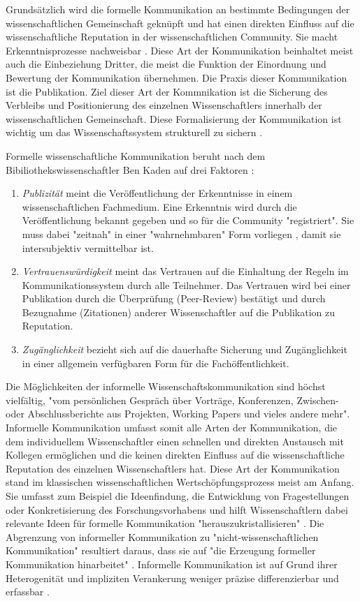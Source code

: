 Grundsätzlich wird die formelle Kommunikation an bestimmte Bedingungen der wissenschaftlichen Gemeinschaft geknüpft und hat einen direkten Einfluss auf die wissenschaftliche Reputation in der wissenschaftlichen Community. Sie macht Erkenntnisprozesse nachweisbar \cite{kaden_2009_library}. Diese Art der Kommunikation beinhaltet meist auch die Einbeziehung Dritter, die meist die Funktion der Einordnung und Bewertung der Kommunikation übernehmen. Die Praxis dieser Kommunikation ist die Publikation. Ziel dieser Art der Kommnikation ist die Sicherung des Verbleibs und Positionierung des einzelnen Wissenschaftlers innerhalb der wissenschaftlichen Gemeinschaft. Diese Formalisierung der Kommunikation ist wichtig um das Wissenschaftssystem strukturell zu sichern \cite{kaden_2009_library}.

Formelle wissenschaftliche Kommunikation beruht nach dem Bibiliothekswissenschaftler Ben Kaden auf drei Faktoren \cite{kaden_2009_library}:
\begin{enumerate}
\item \textit{Publizität} meint die Veröffentlichung der Erkenntnisse in einem wissenschaftlichen Fachmedium. Eine Erkenntnis wird durch die Veröffentlichung bekannt gegeben und so für die Community "registriert".  Sie muss dabei "zeitnah" in einer "wahrnehmbaren" Form vorliegen \cite{Schimank_2012}, damit sie intersubjektiv vermittelbar ist.
\item \textit{Vertrauenswürdigkeit} meint das Vertrauen auf die Einhaltung der Regeln im Kommunikationssystem durch alle Teilnehmer. Das Vertrauen wird bei einer Publikation durch die Überprüfung (Peer-Review) bestätigt und durch Bezugnahme (Zitationen) anderer Wissenschaftler auf die Publikation zu Reputation.
\item \textit{Zugänglichkeit} bezieht sich auf die dauerhafte Sicherung und Zugänglichkeit in einer allgemein verfügbaren Form für die Fachöffentlichkeit.
\end{enumerate}

Die Möglichkeiten der informelle Wissenschaftskommunikation sind höchst vielfältig, "vom persönlichen Gespräch über Vorträge, Konferenzen, Zwischen- oder Abschlussberichte aus Projekten, Working Papers und vieles andere mehr"\cite{Hanekop_2014}. Informelle Kommunikation umfasst somit alle Arten der Kommunikation, die dem individuellem Wissenschaftler einen schnellen und direkten Austausch mit Kollegen ermöglichen und die keinen direkten Einfluss auf die wissenschaftliche Reputation des einzelnen Wissenschaftlers hat. Diese Art der Kommunikation stand im klassischen wissenschaftlichen Wertschöpfungsprozess meist am Anfang. Sie umfasst zum Beispiel die Ideenfindung, die Entwicklung von Fragestellungen oder Konkretisierung des Forschungsvorhabens und hilft Wissenschaftlern dabei relevante Ideen für formelle Kommunikation "herauszukristallisieren" \cite{Hanekop_2014}. Die Abgrenzung von informeller Kommunikation zu "nicht-wissenschaftlichen Kommunikation" resultiert daraus, dass sie auf "die Erzeugung formeller Kommunikation hinarbeitet" \cite{kaden_2009_library}. Informelle Kommunikation ist auf Grund ihrer Heterogenität und impliziten Verankerung weniger präzise differenzierbar und erfassbar \cite{kaden_2009_library}.

